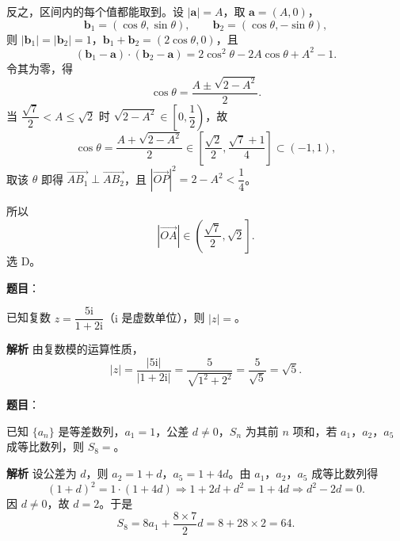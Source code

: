 \begin{answer}
反之，区间内的每个值都能取到。设 $|\boldsymbol a|=A$，取 $\boldsymbol a=(A,0)$，
\nopagebreak[4]
\[\boldsymbol b_1=(\cos\theta,\sin\theta),\qquad \boldsymbol b_2=(\cos\theta,-\sin\theta),\]
则 $|\boldsymbol b_1|=|\boldsymbol b_2|=1$，$\boldsymbol b_1+\boldsymbol b_2=(2\cos\theta,0)$，且
\nopagebreak[4]
\[(\boldsymbol b_1-\boldsymbol a)\cdot(\boldsymbol b_2-\boldsymbol a)=2\cos^2\theta-2A\cos\theta+A^2-1.\]
令其为零，得
\nopagebreak[4]
\[\cos\theta=\frac{A\pm\sqrt{2-A^2}}2.\]
当 $\dfrac{\sqrt7}2<A\leqslant\sqrt2$ 时 $\sqrt{2-A^2}\in\left[0,\dfrac12\right)$，故
\nopagebreak[4]
\[\cos\theta=\frac{A+\sqrt{2-A^2}}2\in\left[\frac{\sqrt2}2,\frac{\sqrt7+1}4\right]\subset(-1,1),\]
取该 $\theta$ 即得 $\overrightarrow{AB_1}\perp\overrightarrow{AB_2}$，且 $|\overrightarrow{OP}|^2=2-A^2<\dfrac14$。

所以
\nopagebreak[4]
\[|\overrightarrow{OA}|\in\left(\frac{\sqrt7}2,\sqrt2\right].\]
选 D。

\gkanswer{答案：D。由 $\overrightarrow{AB_1}\perp\overrightarrow{AB_2}$ 化简得 $|\overrightarrow{OP}|^2=2-|\overrightarrow{OA}|^2$，故 $\tfrac74<|\overrightarrow{OA}|^2\leqslant2$，即 $|\overrightarrow{OA}|\in\left(\tfrac{\sqrt7}2,\sqrt2\right]$。}

\end{answer}
\begin{answer}

\textbf{题目}：

已知复数 $z=\dfrac{5\mathrm i}{1+2\mathrm i}$（$\mathrm i$ 是虚数单位），则 $|z|=$\gkblank{}。

\textbf{解析}
由复数模的运算性质，
\nopagebreak[4]
\[|z|=\frac{|5\mathrm i|}{|1+2\mathrm i|}=\frac5{\sqrt{1^2+2^2}}=\frac5{\sqrt5}=\sqrt5.\]


\end{answer}
\begin{answer}

\textbf{题目}：

已知 $\{a_n\}$ 是等差数列，$a_1=1$，公差 $d\neq0$，$S_n$ 为其前 $n$ 项和，若 $a_1$，$a_2$，$a_5$ 成等比数列，则 $S_8=$\gkblank{}。

\textbf{解析}
设公差为 $d$，则 $a_2=1+d$，$a_5=1+4d$。由 $a_1$，$a_2$，$a_5$ 成等比数列得
\nopagebreak[4]
\[(1+d)^2=1\cdot(1+4d)\Longrightarrow 1+2d+d^2=1+4d\Longrightarrow d^2-2d=0.\]
因 $d\neq0$，故 $d=2$。于是
\nopagebreak[4]
\[S_8=8a_1+\frac{8\times7}2d=8+28\times2=64.\]


\end{answer}
